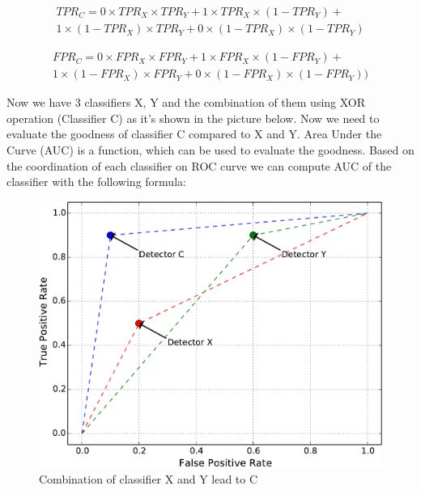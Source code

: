 \begin{multline}
TPR_C = 0 \times TPR_X \times TPR_Y+1\times TPR_X \times(1- TPR_Y)+\\1\times(1- TPR_X)\times TPR_Y+0\times(1- TPR_X)\times(1- TPR_Y)
\end{multline}

\begin{multline}
FPR_C = 0 \times FPR_X \times FPR_Y+1\times FPR_X \times(1- FPR_Y)+\\1\times(1-FPR_X)\times FPR_Y+0\times(1- FPR_X)\times(1-FPR_Y))
\end{multline}

Now we have 3 classifiers X, Y and the combination of them using XOR operation (Classifier C) as it's shown in the picture below. Now we need to evaluate the goodness of classifier C compared to X and Y. Area Under the Curve (AUC) is a function, which can be used to evaluate the goodness. Based on the coordination of each classifier on ROC curve we can compute AUC of the classifier with the following formula:


\begin{figure}[H]
\centering
\includegraphics[scale=0.75]{figs/Classifiers_X_Y_C}
\caption{Combination of classifier X and Y lead to C}
\label{fig::X_Y_C}
\end{figure}


